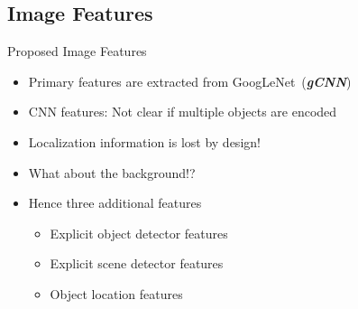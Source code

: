 \documentclass{beamer}
\begin{document}
\subsection{Image Features}
\begin{frame}{Proposed Image Features}
    \begin{itemize}
            \item Primary features are extracted from GoogLeNet~(\textbf{\emph{gCNN}})
        \item CNN features: Not clear if multiple objects are encoded 
        \item Localization information is lost by design! 
        \item What about the background!? 
        \item Hence three additional features 
           \begin{itemize}
               \item Explicit object detector features
               \item Explicit scene detector features 
               \item Object location features 
           \end{itemize}
    \end{itemize}
\end{frame}
\end{document}
